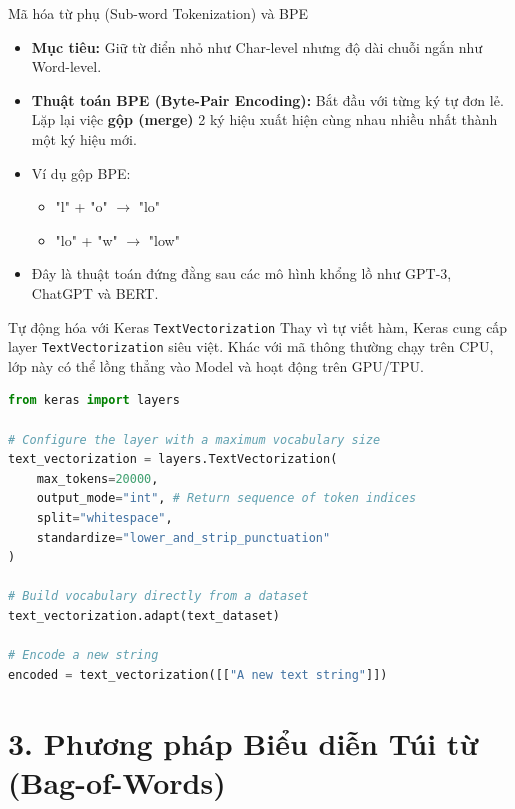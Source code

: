\documentclass[aspectratio=169]{beamer}
\begin{document}
\begin{frame}{Mã hóa từ phụ (Sub-word Tokenization) và BPE}
    \begin{itemize}
        \item \textbf{Mục tiêu:} Giữ từ điển nhỏ như Char-level nhưng độ dài chuỗi ngắn như Word-level.
        \item \textbf{Thuật toán BPE (Byte-Pair Encoding):} Bắt đầu với từng ký tự đơn lẻ. Lặp lại việc \textbf{gộp (merge)} 2 ký hiệu xuất hiện cùng nhau nhiều nhất thành một ký hiệu mới.
        \item Ví dụ gộp BPE:
        \begin{itemize}
            \item "l" + "o" $\rightarrow$ "lo"
            \item "lo" + "w" $\rightarrow$ "low"
        \end{itemize}
        \item Đây là thuật toán đứng đằng sau các mô hình khổng lồ như GPT-3, ChatGPT và BERT.
    \end{itemize}
\end{frame}

\begin{frame}[fragile]{Tự động hóa với Keras \texttt{TextVectorization}}
Thay vì tự viết hàm, Keras cung cấp layer \texttt{TextVectorization} siêu việt. Khác với mã thông thường chạy trên CPU, lớp này có thể lồng thẳng vào Model và hoạt động trên GPU/TPU.
\begin{lstlisting}[language=Python]
from keras import layers

# Configure the layer with a maximum vocabulary size
text_vectorization = layers.TextVectorization(
    max_tokens=20000,
    output_mode="int", # Return sequence of token indices
    split="whitespace",
    standardize="lower_and_strip_punctuation"
)

# Build vocabulary directly from a dataset
text_vectorization.adapt(text_dataset)

# Encode a new string
encoded = text_vectorization([["A new text string"]])
\end{lstlisting}
\end{frame}

\section{3. Phương pháp Biểu diễn Túi từ (Bag-of-Words)}
\end{document}
